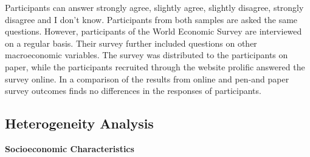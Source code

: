 Participants can answer strongly agree, slightly agree, slightly disagree, strongly disagree and I don't know. Participants from both samples are asked the same questions. However, participants of the World Economic Survey are interviewed on a regular basis. Their survey further included questions on other macroeconomic variables. The survey was distributed to the participants on paper, while the participants recruited through the website prolific answered the survey online. In a comparison of the results from online and pen-and paper survey outcomes \cite{abel} finds no differences in the responses of participants. 


\subsection{Heterogeneity Analysis}
\textbf{Socioeconomic Characteristics}

